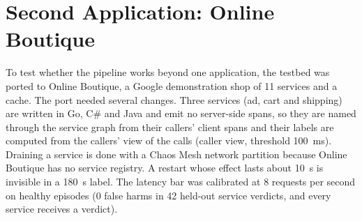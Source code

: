 \section{Second Application: Online Boutique}
To test whether the pipeline works beyond one application, the testbed was ported to Online Boutique, a Google demonstration shop of 11 services and a cache. The port needed several changes. Three services (ad, cart and shipping) are written in Go, C\# and Java and emit no server-side spans, so they are named through the service graph from their callers' client spans and their labels are computed from the callers' view of the calls (caller view, threshold 100~ms). Draining a service is done with a Chaos Mesh network partition because Online Boutique has no service registry. A restart whose effect lasts about 10~s is invisible in a 180~s label. The latency bar was calibrated at 8 requests per second on healthy episodes (0 false harms in 42 held-out service verdicts, and every service receives a verdict).

